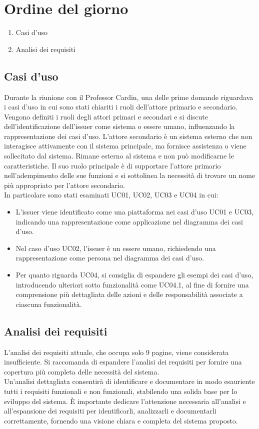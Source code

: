 \section{Ordine del giorno}
\begin{enumerate}
\item Casi d'uso
\item Analisi dei requisiti
\end{enumerate}

\subsection{Casi d'uso}
Durante la riunione con il Professor Cardin, una delle prime domande riguardava i casi d'uso in cui sono stati chiariti i ruoli dell'attore primario e secondario.
Vengono definiti i ruoli degli attori primari e secondari e si discute dell'identificazione dell'issuer come sistema o essere umano, 
influenzando la rappresentazione dei casi d'uso.
L'attore secondario è un sistema esterno che non interagisce attivamente con il sistema principale, ma fornisce assistenza o viene sollecitato dal sistema. 
Rimane esterno al sistema e non può modificarne le caratteristiche. Il suo ruolo principale è di supportare l'attore primario nell'adempimento delle
sue funzioni e si sottolinea la necessità di trovare un nome più appropriato per l'attore secondario.
\\In particolare sono stati esaminati UC01, UC02, UC03 e UC04 in cui:
\begin{itemize}
  \item L'issuer viene identificato come una piattaforma nei casi d'uso UC01 e UC03, indicando una rappresentazione come applicazione nel diagramma dei casi d'uso. 
  \item Nel caso d'uso UC02, l'issuer è un essere umano, richiedendo una rappresentazione come persona nel diagramma dei casi d'uso.
  \item Per quanto riguarda UC04, si consiglia di espandere gli esempi dei casi d'uso, introducendo ulteriori sotto funzionalità come UC04.1, al fine di fornire una comprensione più dettagliata delle azioni e delle responsabilità associate a ciascuna funzionalità.
\end{itemize}

\subsection{Analisi dei requisiti}
L'analisi dei requisiti attuale, che occupa solo 9 pagine, viene considerata insufficiente. Si raccomanda di espandere l'analisi dei requisiti per fornire una copertura più completa delle necessità del sistema.
\\ Un'analisi dettagliata consentirà di identificare e documentare in modo esauriente tutti i requisiti funzionali e non funzionali, stabilendo una solida base per lo sviluppo del sistema.
È importante dedicare l'attenzione necessaria all'analisi e all'espansione dei requisiti per identificarli, analizzarli e documentarli correttamente, fornendo una visione chiara e completa del sistema proposto.
